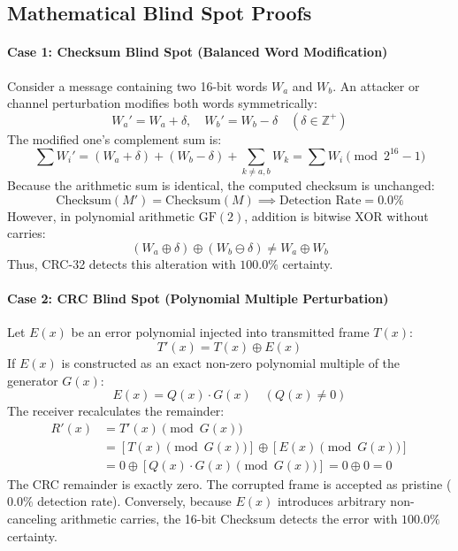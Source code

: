 \documentclass[12pt, a4paper]{article}
\begin{document}
\subsection{Mathematical Blind Spot Proofs}

\paragraph{Case 1: Checksum Blind Spot (Balanced Word Modification)}
Consider a message containing two 16-bit words $W_a$ and $W_b$. An attacker or channel perturbation modifies both words symmetrically:
\begin{equation}
    W_a' = W_a + \delta, \quad W_b' = W_b - \delta \quad (\delta \in \mathbb{Z}^+)
\end{equation}
The modified one's complement sum is:
\begin{equation}
    \sum W_i' = (W_a + \delta) + (W_b - \delta) + \sum_{k \neq a, b} W_k = \sum W_i \pmod{2^{16} - 1}
\end{equation}
Because the arithmetic sum is identical, the computed checksum is unchanged:
\begin{equation}
    \text{Checksum}(M') = \text{Checksum}(M) \implies \text{Detection Rate} = 0.0\%
\end{equation}
However, in polynomial arithmetic $\text{GF}(2)$, addition is bitwise XOR without carries:
\begin{equation}
    (W_a \oplus \delta) \oplus (W_b \ominus \delta) \neq W_a \oplus W_b
\end{equation}
Thus, CRC-32 detects this alteration with $100.0\%$ certainty.

\paragraph{Case 2: CRC Blind Spot (Polynomial Multiple Perturbation)}
Let $E(x)$ be an error polynomial injected into transmitted frame $T(x)$:
\begin{equation}
    T'(x) = T(x) \oplus E(x)
\end{equation}
If $E(x)$ is constructed as an exact non-zero polynomial multiple of the generator $G(x)$:
\begin{equation}
    E(x) = Q(x) \cdot G(x) \quad (Q(x) \neq 0)
\end{equation}
The receiver recalculates the remainder:
\begin{align}
    R'(x) &= T'(x) \pmod{G(x)} \\
          &= [T(x) \pmod{G(x)}] \oplus [E(x) \pmod{G(x)}] \\
          &= 0 \oplus [Q(x) \cdot G(x) \pmod{G(x)}] = 0 \oplus 0 = 0
\end{align}
The CRC remainder is exactly zero. The corrupted frame is accepted as pristine ($0.0\%$ detection rate). Conversely, because $E(x)$ introduces arbitrary non-canceling arithmetic carries, the 16-bit Checksum detects the error with $100.0\%$ certainty.
\end{document}
